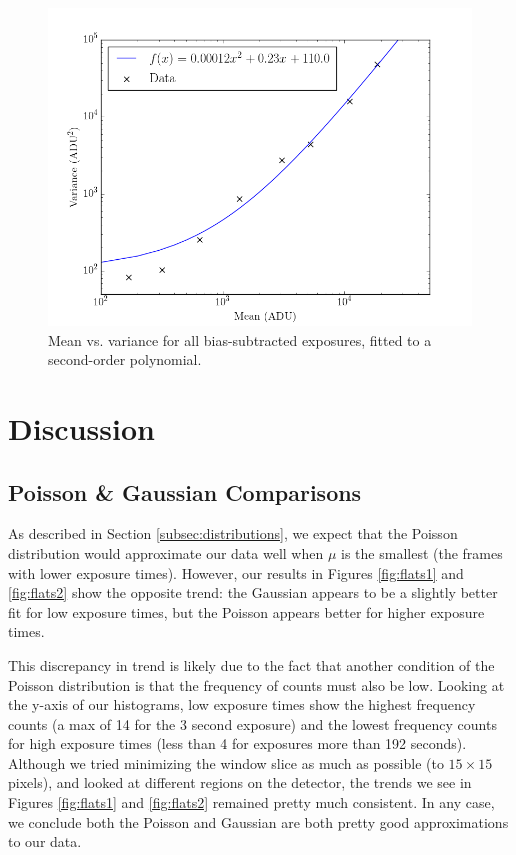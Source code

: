 \documentclass[preprint]{aastex62}
\begin{document}
\begin{figure}[H]
\begin{center}
\includegraphics[width=.48\linewidth]{plots/mean_vs_variance.png}
\caption{Mean vs. variance for all bias-subtracted exposures, fitted to a second-order polynomial.} \label{fig:mean_var}
\end{center}
\end{figure}

\section{Discussion}
\subsection{Poisson \& Gaussian Comparisons} \label{subsec:dist_comparisons}
As described in Section \ref{subsec:distributions}, we expect that the Poisson distribution would approximate our data well when $\mu$ is the smallest (the frames with lower exposure times). However, our results in Figures \ref{fig:flats1} and \ref{fig:flats2} show the opposite trend: the Gaussian appears to be a slightly better fit for low exposure times, but the Poisson appears better for higher exposure times.

This discrepancy in trend is likely due to the fact that another condition of the Poisson distribution is that the frequency of counts must also be low. Looking at the y-axis of our histograms, low exposure times show the highest frequency counts (a max of 14 for the 3 second exposure) and the lowest frequency counts for high exposure times (less than 4 for exposures more than 192 seconds). Although we tried minimizing the window slice as much as possible (to $15\times15$ pixels), and looked at different regions on the detector, the trends we see in Figures \ref{fig:flats1} and \ref{fig:flats2} remained pretty much consistent. In any case, we conclude both the Poisson and Gaussian are both pretty good approximations to our data.
\end{document}
